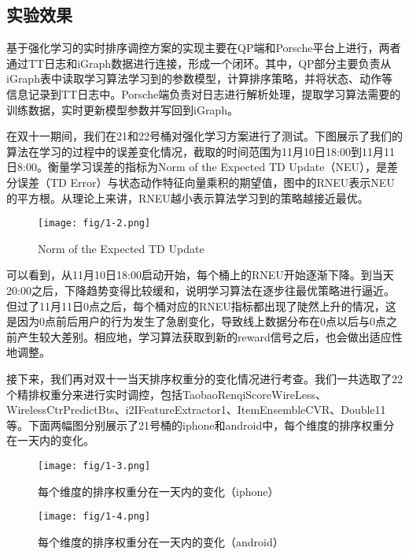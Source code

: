 \subsection{实验效果}

基于强化学习的实时排序调控方案的实现主要在QP端和Porsche平台上进行，两者通过TT日志和iGraph数据进行连接，形成一个闭环。其中，QP部分主要负责从iGraph表中读取学习算法学习到的参数模型，计算排序策略，并将状态、动作等信息记录到TT日志中。Porsche端负责对日志进行解析处理，提取学习算法需要的训练数据，实时更新模型参数并写回到iGraph。

在双十一期间，我们在21和22号桶对强化学习方案进行了测试。下图展示了我们的算法在学习的过程中的误差变化情况，截取的时间范围为11月10日18:00到11月11日8:00。衡量学习误差的指标为Norm of the Expected TD Update（NEU），是差分误差（TD Error）与状态动作特征向量乘积的期望值，图中的RNEU表示NEU的平方根。从理论上来讲，RNEU越小表示算法学习到的策略越接近最优。

\begin{figure}[!h]
\centering
\texttt{[image: fig/1-2.png]}
\caption{Norm of the Expected TD Update}
\end{figure}

可以看到，从11月10日18:00启动开始，每个桶上的RNEU开始逐渐下降。到当天20:00之后，下降趋势变得比较缓和，说明学习算法在逐步往最优策略进行逼近。但过了11月11日0点之后，每个桶对应的RNEU指标都出现了陡然上升的情况，这是因为0点前后用户的行为发生了急剧变化，导致线上数据分布在0点以后与0点之前产生较大差别。相应地，学习算法获取到新的reward信号之后，也会做出适应性地调整。

接下来，我们再对双十一当天排序权重分的变化情况进行考查。我们一共选取了22个精排权重分来进行实时调控，包括TaobaoRenqiScoreWireLess、WirelessCtrPredictBts、i2IFeatureExtractor1、ItemEnsembleCVR、Double11等。下面两幅图分别展示了21号桶的iphone和android中，每个维度的排序权重分在一天内的变化。

\begin{figure}[!h]
\centering
\texttt{[image: fig/1-3.png]}
\caption{每个维度的排序权重分在一天内的变化（iphone）}
\end{figure}
\begin{figure}[!h]
\centering
\texttt{[image: fig/1-4.png]}
\caption{每个维度的排序权重分在一天内的变化（android）}
\end{figure}

